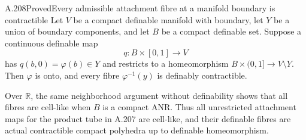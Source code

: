 \begin{saresult}{A.208}{Proved}{Every admissible attachment fibre at a manifold boundary is contractible}
Let $V$ be a compact definable manifold with boundary, let $Y$ be a
union of boundary components, and let $B$ be a compact definable set.
Suppose a continuous definable map
\[
 q:B\times[0,1]\longrightarrow V
\]
has $q(b,0)=\varphi(b)\in Y$ and restricts to a homeomorphism
$B\times(0,1]\to V\setminus Y$. Then $\varphi$ is onto, and every
fibre $\varphi^{-1}(y)$ is definably contractible.

Over $\mathbb R$, the same neighborhood argument without definability
shows that all fibres are cell-like when $B$ is a compact ANR. Thus
all unrestricted attachment maps for the product tube in A.207 are
cell-like, and their definable fibres are actual contractible compact
polyhedra up to definable homeomorphism.
\end{saresult}
